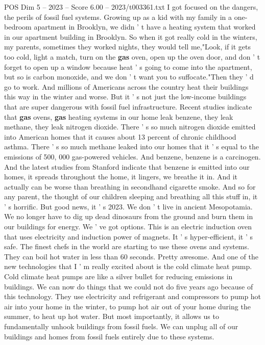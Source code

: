 \begin{textsample}{POS Dim 5 – 2023 – Score 6.00 – 2023/t003361.txt}
I got focused on the dangers, the perils of fossil fuel systems.
Growing up as a kid with my family in a one-bedroom apartment in Brooklyn, we didn ' t have a heating system that worked in our apartment building in Brooklyn.
So when it got really cold in the winters, my parents, sometimes they worked nights, they would tell me,"Look, if it gets too cold, light a match, turn on the \textbf{gas} oven, open up the oven door, and don ' t forget to open up a window because heat ' s going to come into the apartment, but so is carbon monoxide, and we don ' t want you to suffocate."Then they ' d go to work.
And millions of Americans across the country heat their buildings this way in the winter and worse.
But it ' s not just the low-income buildings that are super dangerous with fossil fuel infrastructure.
Recent studies indicate that \textbf{gas} ovens, \textbf{gas} heating systems in our home leak benzene, they leak methane, they leak nitrogen dioxide.
There ' s so much nitrogen dioxide emitted into American homes that it causes about 13 percent of chronic childhood asthma.
There ' s so much methane leaked into our homes that it ' s equal to the emissions of 500, 000 gas-powered vehicles.
And benzene, benzene is a carcinogen.
And the latest studies from Stanford indicate that benzene is emitted into our homes, it spreads throughout the home, it lingers, we breathe it in.
And it actually can be worse than breathing in secondhand cigarette smoke.
And so for any parent, the thought of our children sleeping and breathing all this stuff in, it ' s horrific.
But good news, it ' s 2023.
We don ' t live in ancient Mesopotamia.
We no longer have to dig up dead dinosaurs from the ground and burn them in our buildings for energy.
We ' ve got options.
This is an electric induction oven that uses electricity and induction power of magnets.
It ' s hyper-efficient, it ' s safe.
The finest chefs in the world are starting to use these ovens and systems.
They can boil hot water in less than 60 seconds.
Pretty awesome.
And one of the new technologies that I ' m really excited about is the cold climate heat pump.
Cold climate heat pumps are like a silver bullet for reducing emissions in buildings.
We can now do things that we could not do five years ago because of this technology.
They use electricity and refrigerant and compressors to pump hot air into your home in the winter, to pump hot air out of your home during the summer, to heat up hot water.
But most importantly, it allows us to fundamentally unhook buildings from fossil fuels.
We can unplug all of our buildings and homes from fossil fuels entirely due to these systems.

\end{textsample}
